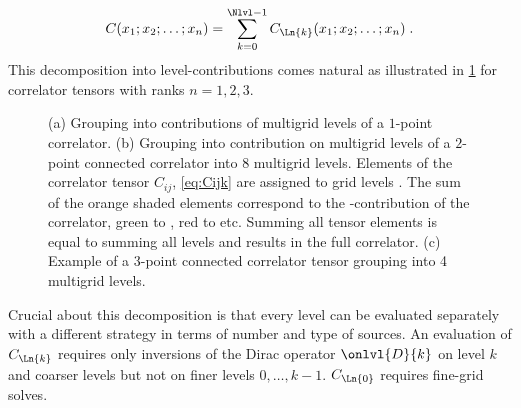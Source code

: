 \begin{align}
C(x_1;x_2;\ldots;x_n) = \sum_{k=0}^{\Nlvl-1} C_{\Ln{k}}(x_1;x_2;\ldots;x_n) \;.
\end{align}
This decomposition into level-contributions comes natural as illustrated in \cref{fig:mg:corr} for correlator tensors with ranks $n=1,2,3$.
% 
\begin{figure}
\centering
{}
% 
% 
% 
\caption{(a) Grouping into contributions of multigrid levels of a $1$-point correlator. (b) Grouping into contribution on multigrid levels of a $2$-point connected correlator into \num{8} multigrid levels. Elements of the correlator tensor $C_{ij}$, \cref{eq:Cijk} are assigned to grid levels . The sum of the orange shaded elements correspond to the -contribution of the correlator, green to , red to  etc. Summing all tensor elements is equal to summing all levels and results in the full correlator. (c) Example of a $3$-point connected correlator tensor grouping into \num{4} multigrid levels. \takenpart }
\label{fig:mg:corr}
\end{figure}
Crucial about this decomposition is that every level can be evaluated separately with a different strategy in terms of number and type of sources.
An evaluation of $C_{\Ln{k}}$ requires only inversions of the Dirac operator $\onlvl{D}{k}$ on level $k$ and coarser levels but not on finer levels $0, \ldots, k-1$.
$C_{\Ln{0}}$ requires fine-grid solves.

